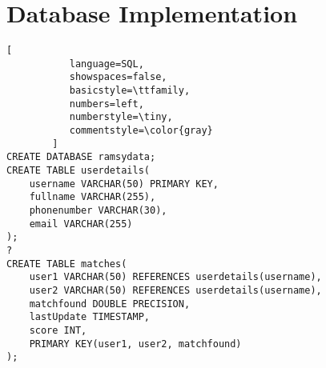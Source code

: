 \chapter{Database Implementation}
\label{appendix:database}
\begin{lstlisting}[
           language=SQL,
           showspaces=false,
           basicstyle=\ttfamily,
           numbers=left,
           numberstyle=\tiny,
           commentstyle=\color{gray}
        ]
CREATE DATABASE ramsydata;
CREATE TABLE userdetails(
	username VARCHAR(50) PRIMARY KEY,
	fullname VARCHAR(255),
	phonenumber VARCHAR(30),
	email VARCHAR(255)
);
?
CREATE TABLE matches(
	user1 VARCHAR(50) REFERENCES userdetails(username),
	user2 VARCHAR(50) REFERENCES userdetails(username),
	matchfound DOUBLE PRECISION,
	lastUpdate TIMESTAMP,
	score INT,
	PRIMARY KEY(user1, user2, matchfound)
);
\end{lstlisting}